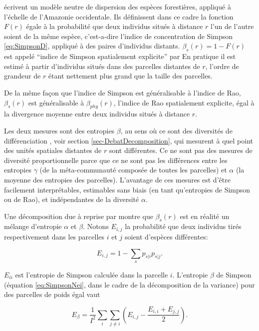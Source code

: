 \documentclass[
  11pt,
  french,
  a4paper,
  extrafontsizes,onecolumn,openright
  ]{memoir}
\begin{document}
\textcite{Chave2002} écrivent un modèle neutre de dispersion des espèces forestières, appliqué à l'échelle de l'Amazonie occidentale\autocite{Condit2002}.
Ils définissent dans ce cadre la fonction \(F(r)\) égale à la probabilité que deux individus situés à distance \(r\) l'un de l'autre soient de la même espèce, c'est-a-dire l'indice de concentration de Simpson \eqref{eq:SimpsonD}, appliqué à des paires d'individus distants.
\(\beta_s(r)=1-F(r)\) est appelé \enquote{indice de Simpson spatialement explicite} par \textcite{Shen2013}
En pratique il est estimé à partir d'individus situés dans des parcelles distantes de \(r\), l'ordre de grandeur de \(r\) étant nettement plus grand que la taille des parcelles.

De la même façon que l'indice de Simpson est généralisable à l'indice de Rao, \(\beta_s(r)\) est généralisable à \(\beta_{phy}(r)\), l'indice de Rao spatialement explicite, égal à la divergence moyenne entre deux individus situés à distance \(r\).

Les deux mesures sont des entropies \(\beta\), au sens où ce sont des diversités de différenciation \autocite{Jurasinski2009}, voir section \ref{sec-DebatDecomposition}, qui mesurent à quel point des unités spatiales distantes de \(r\) sont différentes.
Ce ne sont pas des mesures de diversité proportionnelle parce que ce ne sont pas les différences entre les entropies \(\gamma\) (de la méta-communauté composée de toutes les parcelles) et \(\alpha\) (la moyenne des entropies des parcelles).
L'avantage de ces mesures est d'être facilement interprétables, estimables sans biais (en tant qu'entropies de Simpson ou de Rao), et indépendantes de la diversité \(\alpha\).

Une décomposition due à \textcite{Nei1973} reprise par \textcite{Chave2007} montre que \(\beta_s(r)\) est en réalité un mélange d'entropie \(\alpha\) et \(\beta\).
Notons \(E_{i,j}\) la probabilité que deux individus tirés respectivement dans les parcelles \(i\) et \(j\) soient d'espèces différentes:

\begin{equation}
  \label{eq:Nei1973}
  E_{i,j} = 1-\sum_{s}{p_{s|i}}{p_{s|j}}.
\end{equation}

\(E_{ii}\) est l'entropie de Simpson calculée dans la parcelle \(i\).
L'entropie \(\beta\) de Simpson (équation \eqref{eq:SimpsonNei}, dans le cadre de la décomposition de la variance) pour des parcelles de poids égal vaut

\begin{equation}
  \label{eq:EbetaNei}
  E_{\beta} = \frac{1}{I^2} \sum_{i}\sum_{j\ne i}\left({E_{i,j}-\frac{E_{i,i}+E_{j,j}}{2}}\right).
\end{equation}
\end{document}
